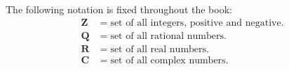 The following notation is fixed throughout the book:
$$
\begin{aligned}
\mathbf{Z} &= \text{set of all integers, positive and negative}.\\
\mathbf{Q} &= \text{set of all rational numbers}.\\
\mathbf{R} &= \text{set of all real numbers}.\\
\mathbf{C} &= \text{set of all complex numbers}.
\end{aligned}
$$
